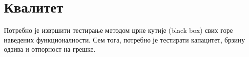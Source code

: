 \section{Квалитет}
Потребно је извршити тестирање методом црне кутије (black box) свих горе наведених функционалности. Сем тога, потребно је тестирати капацитет, брзину одзива и отпорност на грешке. 